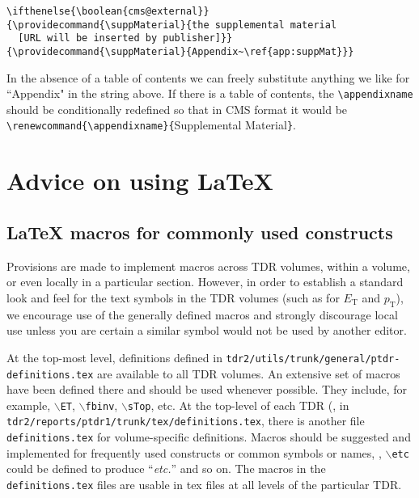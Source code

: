 \begin{verbatim}
\ifthenelse{\boolean{cms@external}}
{\providecommand{\suppMaterial}{the supplemental material
  [URL will be inserted by publisher]}}
{\providecommand{\suppMaterial}{Appendix~\ref{app:suppMat}}}
\end{verbatim}
In the absence of a table of contents we can freely substitute anything we like for ``Appendix"  in the string above. If there is a table of contents, the \verb|\appendixname| should be conditionally redefined so that in CMS format it would be \verb|\renewcommand{\appendixname}{|Supplemental Material\verb|}|.


\clearpage
\section{Advice on using \texorpdfstring{\LaTeX}{LaTeX}\label{latex}}

\subsection{\texorpdfstring{\LaTeX}{LaTeX} macros for commonly used constructs}

Provisions are made to implement macros across TDR volumes, within a
volume, or even locally in a particular section. However, in order to
establish a standard look and feel for the text symbols in the TDR
volumes
(such  as for $E_\text{T}$ and $p_\text{T}$),
we encourage use of the generally
defined macros and strongly discourage local use unless you are
certain a similar symbol would not be used by another editor.

At the top-most level, definitions defined in
{\texttt{tdr2/utils/trunk/general/ptdr-definitions.tex}} are
available to all TDR volumes. An extensive set of macros have been
defined there and should be used whenever possible. They include, for
example, $\backslash$\texttt{ET}, $\backslash$\texttt{fbinv},
$\backslash$\texttt{sTop}, etc.
At the top-level of each TDR
(\eg, in \texttt{tdr2/reports/ptdr1/trunk/tex/definitions.tex}, there is another
file \texttt{definitions.tex} for volume-specific definitions. Macros
should be suggested and implemented for
frequently used constructs or common symbols or names, \eg,
{$\backslash$\texttt{etc}}
could be defined to produce ``\emph{etc.}'' and so on.
The macros in the \texttt{definitions.tex} files are usable
in tex files at all levels of the particular TDR.

